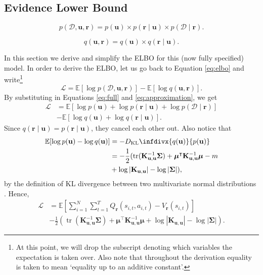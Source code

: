 \documentclass{mpaper}
\DeclareMathOperator{\tr}{tr}
\newcommand{\DKL}{D_{\mathrm{KL}}\infdivx}
\newcommand{\V}{V_{\mathbf{r}}}
\newcommand{\Kuu}{\mathbf{K}_{\mathbf{u},\mathbf{u}}}
\newcommand{\pfull}{p(\mathcal{D}, \mathbf{u}, \mathbf{r})}
\newcommand{\approximation}{q(\mathbf{u}, \mathbf{r})}
\begin{document}
\subsection{Evidence Lower Bound}

\begin{equation} \label{eq:full}
  \pfull = p(\mathbf{u}) \times p(\mathbf{r} \mid \mathbf{u}) \times p(\mathcal{D} \mid \mathbf{r}).
\end{equation}

\begin{equation} \label{eq:approximation}
  \approximation = q(\mathbf{u}) \times q(\mathbf{r} \mid \mathbf{u}).
\end{equation}

In this section we derive and simplify the ELBO for this (now fully specified)
model. In order to derive the ELBO, let us go back to Equation \ref{eq:elbo} and
write\footnote{At this point, we will drop the subscript denoting which
  variables the expectation is taken over. Also note that throughout the
  derivation equality is taken to mean `equality up to an additive constant'.}
\[
  \mathcal{L} = \mathbb{E}[\log\pfull] - \mathbb{E}[\log\approximation].
\]
By substituting in Equations \ref{eq:full} and \ref{eq:approximation}, we get
\begin{align*}
  \mathcal{L} &= \mathbb{E}[\log p(\mathbf{u}) + \log p(\mathbf{r} \mid \mathbf{u}) + \log p(\mathcal{D} \mid \mathbf{r})] \\
              &- \mathbb{E}[\log q(\mathbf{u}) + \log q(\mathbf{r} \mid \mathbf{u})].
\end{align*}
Since $q(\mathbf{r} \mid \mathbf{u}) = p(\mathbf{r} \mid \mathbf{u})$, they
cancel each other out. Also notice that
\begin{align*}
  \mathbb{E}[\log p(\mathbf{u}) - \log q(\mathbf{u})] &= -\DKL{q(\mathbf{u})}{p(\mathbf{u})} \\
                                                      &= -\frac{1}{2} (\tr (\Kuu^{-1}\bm\Sigma) + \bm\mu^\intercal\Kuu^{-1}\bm\mu - m \\
                                                      &+ \log |\Kuu| - \log |\bm\Sigma|),
\end{align*}
by the definition of KL divergence between two multivariate normal distributions
\cite{kl}. Hence,
\begin{align*}
  \mathcal{L} &= \mathbb{E}\left[ \sum_{i=1}^N \sum_{t=1}^T Q_{\mathbf{r}}(s_{i,t}, a_{i,t}) - \V(s_{i,t}) \right] \\
              &- \frac{1}{2} \left(\tr \left( \Kuu^{-1}\bm\Sigma \right) + \bm\mu^\intercal\Kuu^{-1}\bm\mu + \log |\Kuu| - \log |\bm\Sigma| \right).
\end{align*}
\end{document}
